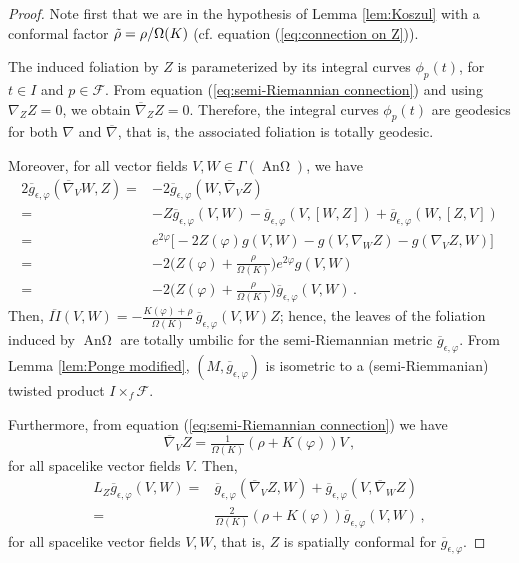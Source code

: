 \documentclass[12pt]{article}
\DeclareMathOperator{\An}{\text{An}\Omega}
\def\f{\mathcal F}
\begin{document}
\begin{proof}
    Note first that we are in the hypothesis of Lemma \ref{lem:Koszul} with a conformal factor $\Tilde{\rho}=\rho/\Omega(K)$ (cf. equation (\ref{eq:connection on Z})).

    The induced foliation by $Z$ is parameterized by its integral curves $\phi_p(t)$, for $t\in I$ and $p\in \f$. From equation (\ref{eq:semi-Riemannian connection}) and using $\nabla_Z Z=0$, we obtain $\overline{\nabla}_Z Z = 0$. Therefore, the integral curves $\phi_p(t)$ are geodesics for both $\nabla$ and $\overline{\nabla}$, that is, the associated foliation is totally geodesic.
    
    Moreover, for all vector fields $V,W\in \Gamma(\An)$, we have
    \begin{equation*}
    \begin{split}
        2 \overline{g}_{\epsilon,\varphi}(\overline{\nabla}_V W, Z) ={}& -2\overline{g}_{\epsilon,\varphi}(W,\overline{\nabla}_V Z)\\
        ={}& - Z \overline{g}_{\epsilon,\varphi} (V,W) - \overline{g}_{\epsilon,\varphi}(V,[W,Z]) + \overline{g}_{\epsilon,\varphi}(W,[Z,V]) \\
        ={}& e^{2\varphi}\big[ -2 Z(\varphi) g(V,W) - g(V,\nabla_W Z) - g(\nabla_V Z, W) \big] \\
        ={}& -2\big( Z(\varphi) + \tfrac{\rho}{\Omega(K)}\big) e^{2\varphi} g(V,W)\\
        ={}& -2\big( Z(\varphi) + \tfrac{\rho}{\Omega(K)}\big) \overline{g}_{\epsilon,\varphi}(V,W)\,.
    \end{split}   
    \end{equation*}
    Then, $\overline{II}(V,W) = -\tfrac{K(\varphi) + \rho}{\Omega(K)}\, \overline{g}_{\epsilon,\varphi}(V,W) Z$; hence, the leaves of the foliation induced by $\An$ are totally umbilic for the semi-Riemannian metric $\overline{g}_{\epsilon,\varphi}$. From Lemma \ref{lem:Ponge modified}, $(M,\overline{g}_{\epsilon, \varphi})$ is isometric to a (semi-Riemmanian) twisted product $I\times_f \f$.

    Furthermore, from equation (\ref{eq:semi-Riemannian connection}) we have 
    \[
        \overline{\nabla}_V Z = \tfrac{1}{\Omega(K)} (\rho + K(\varphi)) V\,,
    \]
    for all spacelike vector fields $V$.
    Then,
    \[
    \begin{aligned}
        L_Z \overline{g}_{\epsilon,\varphi} (V,W) ={}& \overline{g}_{\epsilon,\varphi}(\overline{\nabla}_V Z,W) + \overline{g}_{\epsilon,\varphi}(V, \overline{\nabla}_W Z)\\
        ={}& \tfrac{2}{\Omega(K)} (\rho + K(\varphi)) \overline{g}_{\epsilon,\varphi} (V,W)\,,
    \end{aligned}
    \]
    for all spacelike vector fields $V,W$, that is, $Z$ is spatially conformal for $\overline{g}_{\epsilon,\varphi}$.

\end{proof}
\end{document}

